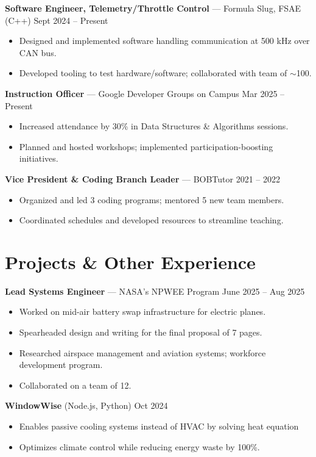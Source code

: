 \documentclass[letterpaper,10pt]{article}
\begin{document}
\textbf{Software Engineer, Telemetry/Throttle Control} --- Formula Slug, FSAE (C++)
\hfill Sept 2024 -- Present
\begin{itemize}
    \item Designed and implemented software handling communication at 500 kHz over CAN bus.
    \item Developed tooling to test hardware/software; collaborated with team of $\sim$100.
\end{itemize}

\textbf{Instruction Officer} --- Google Developer Groups on Campus \hfill Mar
2025 -- Present
\begin{itemize}
    \item Increased attendance by 30\% in Data Structures \& Algorithms sessions.
    \item Planned and hosted workshops; implemented participation-boosting initiatives.
\end{itemize}

\textbf{Vice President \& Coding Branch Leader} --- BOBTutor \hfill 2021 --
2022
\begin{itemize}
    \item Organized and led 3 coding programs; mentored 5 new team members.
    \item Coordinated schedules and developed resources to streamline teaching.
\end{itemize}

\section*{Projects \& Other Experience}
\textbf{Lead Systems Engineer} --- NASA's NPWEE Program \hfill June 2025 -- Aug 2025
\begin{itemize}
    \item Worked on mid-air battery swap infrastructure for electric planes.
    \item Spearheaded design and writing for the final proposal of 7 pages.
    \item Researched airspace management and aviation systems; workforce development program.
    \item Collaborated on a team of 12.
\end{itemize}

\textbf{WindowWise} (Node.js, Python) \hfill Oct 2024
\begin{itemize}
    \item Enables passive cooling systems instead of HVAC by solving heat equation
    \item Optimizes climate control while reducing energy waste by 100\%.
\end{itemize}
\end{document}
